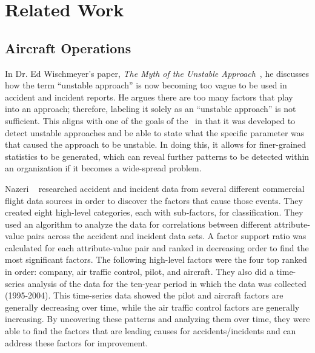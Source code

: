 
\chapter{Related Work} \label{ch:related_work}

\section{Aircraft Operations}

	In Dr. Ed Wischmeyer's paper, \emph{The Myth of the Unstable Approach}~\cite{wischmeyer2004the-myth}, he discusses how the term ``unstable approach'' is now becoming too vague to be used in accident and incident reports.  He argues there are too many factors that play into an approach; therefore, labeling it solely as an ``unstable approach'' is not sufficient.  This aligns with one of the goals of the \toolname\ in that it was developed to detect unstable approaches and be able to state what the specific parameter was that caused the approach to be unstable.  In doing this, it allows for finer-grained statistics to be generated, which can reveal further patterns to be detected within an organization if it becomes a wide-spread problem.
    
    Nazeri \etal~\cite{Nazeri:2008:Analyzing-Relat} researched accident and incident data from several different commercial flight data sources in order to discover the factors that cause those events.  They created eight high-level categories, each with sub-factors, for classification.  They used an algorithm to analyze the data for correlations between different attribute-value pairs across the accident and incident data sets.  A factor support ratio was calculated for each attribute-value pair and ranked in decreasing order to find the most significant factors.  The following high-level factors were the four top ranked in order:  company, air traffic control, pilot, and aircraft.  They also did a time-series analysis of the data for the ten-year period in which the data was collected (1995-2004).  This time-series data showed the pilot and aircraft factors are generally decreasing over time, while the air traffic control factors are generally increasing.  By uncovering these patterns and analyzing them over time, they were able to find the factors that are leading causes for accidents/incidents and can address these factors for improvement.


